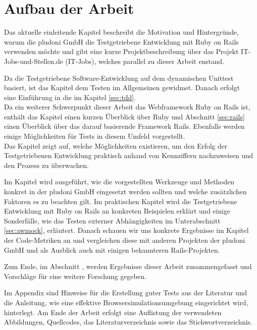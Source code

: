 \section{Aufbau der Arbeit}

Das aktuelle einleitende Kapitel beschreibt die Motivation und Hintergründe, warum die pludoni GmbH die Testgetriebene Entwicklung mit Ruby on Rails verwenden möchte und gibt eine kurze Projektbeschreibung über das Projekt IT-Jobs-und-Stellen.de (IT-Jobs), welches parallel zu dieser Arbeit enstand.

Da die Testgetriebene Software-Entwicklung auf dem dynamischen Unittest basiert, ist das Kapitel  dem Testen im Allgemeinen gewidmet. Danach erfolgt eine Einführung in die \textit{} im Kapitel \ref{sec:tdd}. \\
Da ein weiterer Schwerpunkt dieser Arbeit das Webframework Ruby on Rails ist, enthält das Kapitel  einen kurzen Überblick über Ruby und Abschnitt \ref{sec:rails} einen Überblick über das darauf basierende Framework Rails. Ebenfalls werden einige Möglichkeiten für Tests in diesem Umfeld vorgestellt.\\
Das Kapitel  zeigt auf, welche Möglichkeiten existieren, um den Erfolg der Testgetriebenen Entwicklung praktisch anhand von Kennziffern nachzuweisen und den Prozess zu überwachen.

Im Kapitel  wird ausgeführt, wie die vorgestellten Werkzeuge und Methoden konkret in der pludoni GmbH eingesetzt werden sollten und welche zusätzlichen Faktoren es zu beachten gilt.
Im praktischen Kapitel  wird die Testgetriebene Entwicklung mit Ruby on Rails an konkreten Beispielen erklärt und einige Sonderfälle, wie das Testen externer Abhängigkeiten im Unterabschnitt \ref{sec:awmock}, erläutert.
Danach schauen wir uns konkrete Ergebnisse im Kapitel  der Code-Metriken an und vergleichen diese mit anderen Projekten der pludoni GmbH und als Ausblick auch mit einigen bekannteren Rails-Projekten.

Zum Ende, im Abschnitt , werden Ergebnisse dieser Arbeit zusammengefasst und Vorschläge für eine weitere Forschung gegeben.

Im Appendix sind Hinweise für die Erstellung guter Tests aus der Literatur und die Anleitung, wie eine effektive Browsersimulationsumgebung eingerichtet wird, hinterlegt. Am Ende der Arbeit erfolgt eine Auflistung der verwendeten Abbildungen, Quellcodes,  das Literaturverzeichnis sowie das Stichwortverzeichnis.

